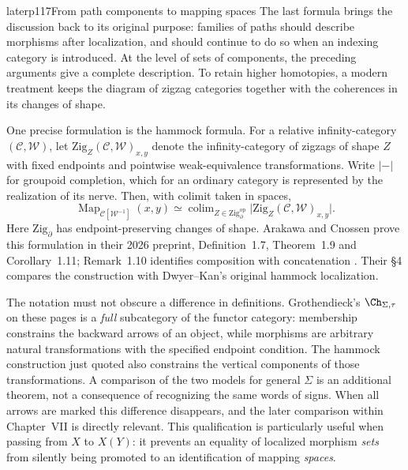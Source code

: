 \begin{dcomment}{later}{p117}{From path components to mapping spaces}
The last formula brings the discussion back to its original purpose: families of paths should describe morphisms after localization, and should continue to do so when an indexing category is introduced.  At the level of sets of components, the preceding arguments give a complete description.  To retain higher homotopies, a modern treatment keeps the diagram of zigzag categories together with the coherences in its changes of shape.

One precise formulation is the hammock formula.  For a relative infinity-category $(\mathcal C,\mathcal W)$, let $\mathrm{Zig}_{Z}(\mathcal C,\mathcal W)_{x,y}$ denote the infinity-category of zigzags of shape $Z$ with fixed endpoints and pointwise weak-equivalence transformations.  Write $|{-}|$ for groupoid completion, which for an ordinary category is represented by the realization of its nerve.  Then, with colimit taken in spaces,
\[
 \operatorname{Map}_{\mathcal C[\mathcal W^{-1}]}(x,y)
 \simeq
 \mathop{\operatorname{colim}}_{Z\in\mathrm{Zig}_{\partial}^{\mathrm{op}}}
 \bigl|\mathrm{Zig}_{Z}(\mathcal C,\mathcal W)_{x,y}\bigr|.
\]
Here $\mathrm{Zig}_{\partial}$ has endpoint-preserving changes of shape.  Arakawa and Cnossen prove this formulation in their 2026 preprint, Definition~1.7, Theorem~1.9 and Corollary~1.11; Remark~1.10 identifies composition with concatenation \citep{ArakawaCnossen2026}.  Their \S4 compares the construction with Dwyer--Kan's original hammock localization.

The notation must not obscure a difference in definitions.  Grothendieck's $\Ch_{\Sigma,\tau}$ on these pages is a \emph{full} subcategory of the functor category: membership constrains the backward arrows of an object, while morphisms are arbitrary natural transformations with the specified endpoint condition.  The hammock construction just quoted also constrains the vertical components of those transformations.  A comparison of the two models for general $\Sigma$ is an additional theorem, not a consequence of recognizing the same words of signs.  When all arrows are marked this difference disappears, and the later comparison within Chapter~VII is directly relevant.  This qualification is particularly useful when passing from $X$ to $X(Y)$: it prevents an equality of localized morphism \emph{sets} from silently being promoted to an identification of mapping \emph{spaces}.
\end{dcomment}

